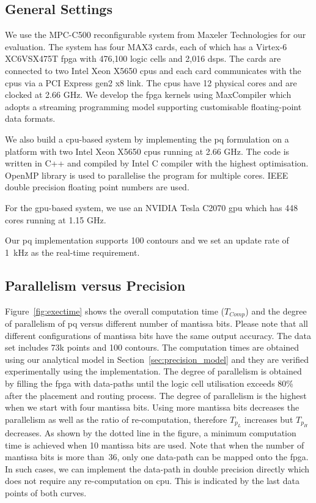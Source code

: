 \subsection{General Settings}
We use the MPC-C500 reconfigurable system from Maxeler Technologies for our evaluation.
The system has four MAX3 cards, each of which has a Virtex-6 XC6VSX475T \gls{fpga} with 476,100 logic cells and 2,016 \glspl{dsp}.
The cards are connected to two Intel Xeon X5650 \gls{cpu}s and each card communicates with the \gls{cpu}s via a PCI Express gen2 x8 link. 
The \gls{cpu}s have 12 physical cores and are clocked at 2.66 GHz.
We develop the \gls{fpga} kernels using MaxCompiler which adopts a streaming programming model supporting customisable floating-point data formats.

We also build a \gls{cpu}-based system by implementing the \gls{pq} formulation on a platform with two Intel Xeon X5650 \gls{cpu}s running at 2.66 GHz.
The code is written in C++ and compiled by Intel C compiler with the highest optimisation.
OpenMP library is used to parallelise the program for multiple cores.
IEEE double precision floating point numbers are used.

For the \gls{gpu}-based system, we use an NVIDIA Tesla C2070 \gls{gpu} which has 448 cores running at 1.15 GHz.

Our \gls{pq} implementation supports 100 contours and we set an update rate of 1~kHz as the real-time requirement.

\subsection{Parallelism versus Precision}
\label{sec:precision_parallelism}

Figure~\ref{fig:exectime} shows the overall computation time ($T_{Comp}$)
and the degree of parallelism of \gls{pq} versus different number of mantissa bits.
Please note that all different configurations of mantissa bits have the same output accuracy.
The data set includes 73k points and 100 contours.
The computation times are obtained using our analytical model in Section~\ref{sec:precision_model} and they are verified experimentally using the implementation.
The degree of parallelism is obtained by filling the \gls{fpga} with data-paths until the logic cell utilisation exceeds 80\% after the placement and routing process.
The degree of parallelism is the highest when we start with four mantissa bits.
Using more mantissa bits decreases the parallelism as well as the ratio of re-computation, therefore $T_{p_L}$ increases but $T_{p_H}$ decreases.
As shown by the dotted line in the figure, a minimum computation time is achieved when 10 mantissa bits are used.
Note that when the number of mantissa bits is more than~36, only one data-path can be mapped onto the \gls{fpga}.
In such cases, we can implement the data-path in double precision directly which does not require any re-computation on \gls{cpu}.
This is indicated by the last data points of both curves.

